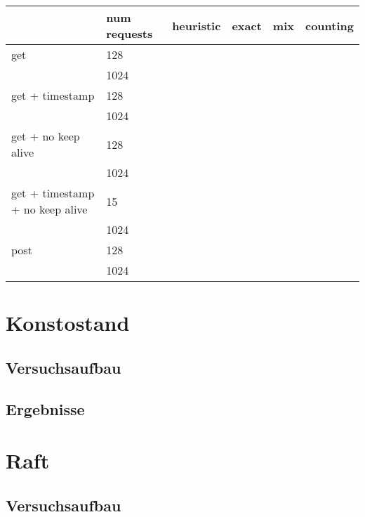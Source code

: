 \documentclass[a4paper]{report}
\begin{document}
\begin{table}[]
	\begin{tabular}{l l|l l l l}
		\hline
		                                & num requests & heuristic & exact & mix & counting \\ \hline
		get                             & 128          &           &       &     &          \\
		                                & 1024         &           &       &     &          \\ \hline
		get + timestamp                 & 128          &           &       &     &          \\
		                                & 1024         &           &       &     &          \\ \hline
		get + no keep alive             & 128          &           &       &     &          \\
		                                & 1024         &           &       &     &          \\ \hline
		get + timestamp + no keep alive & 15           &           &       &     &          \\
		                                & 1024         &           &       &     &          \\ \hline
		post                            & 128          &           &       &     &          \\
		                                & 1024         &           &       &     &          \\
	\end{tabular}
\end{table}

\section{Konstostand}
\subsection{Versuchsaufbau}
\subsection{Ergebnisse}
\section{Raft}
\subsection{Versuchsaufbau}
\end{document}
